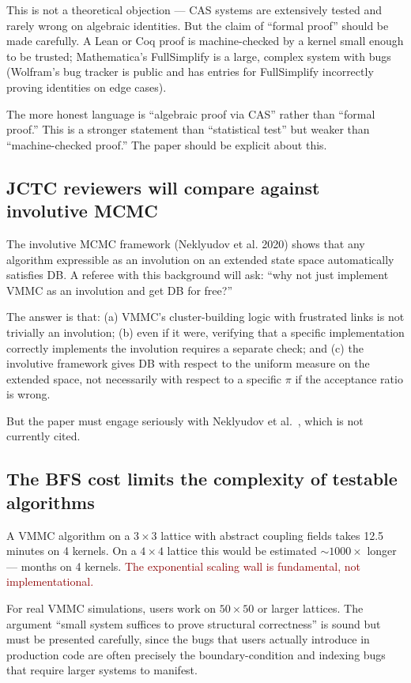 \documentclass[11pt,a4paper]{article}
\newcommand{\bad}[1]{\textcolor{darkred}{#1}}
\begin{document}
This is not a theoretical objection — CAS systems are extensively tested and rarely
wrong on algebraic identities.  But the claim of ``formal proof'' should be made
carefully.  A Lean or Coq proof is machine-checked by a kernel small enough to be
trusted; Mathematica's FullSimplify is a large, complex system with bugs
(Wolfram's bug tracker is public and has entries for FullSimplify incorrectly
proving identities on edge cases).

The more honest language is ``algebraic proof via CAS'' rather than ``formal
proof.''  This is a stronger statement than ``statistical test'' but weaker than
``machine-checked proof.''  The paper should be explicit about this.

\subsection{JCTC reviewers will compare against involutive MCMC}

The involutive MCMC framework (Neklyudov et al. 2020) shows that any algorithm
expressible as an involution on an extended state space automatically satisfies DB.
A referee with this background will ask: ``why not just implement VMMC as an
involution and get DB for free?''

The answer is that: (a) VMMC's cluster-building logic with frustrated links is
not trivially an involution; (b) even if it were, verifying that a specific
implementation correctly implements the involution requires a separate check;
and (c) the involutive framework gives DB with respect to the uniform measure on
the extended space, not necessarily with respect to a specific $\pi$ if the
acceptance ratio is wrong.

But the paper must engage seriously with Neklyudov et al.~\cite{Neklyudov2020},
which is not currently cited.

\subsection{The BFS cost limits the complexity of testable algorithms}

A VMMC algorithm on a $3\times3$ lattice with abstract coupling fields takes 12.5
minutes on 4 kernels.  On a $4\times4$ lattice this would be estimated
$\sim\!1000\times$ longer — months on 4 kernels.  \bad{The exponential scaling wall
is fundamental, not implementational.}

For real VMMC simulations, users work on $50\times50$ or larger lattices.  The
argument ``small system suffices to prove structural correctness'' is sound but
must be presented carefully, since the bugs that users actually introduce in
production code are often precisely the boundary-condition and indexing bugs that
require larger systems to manifest.
\end{document}
